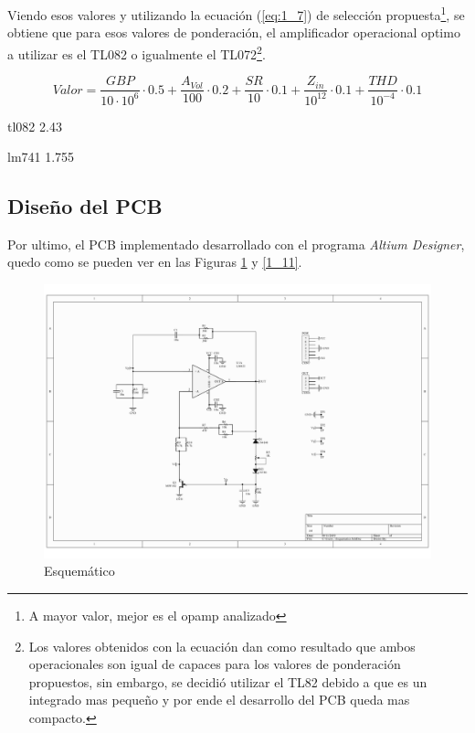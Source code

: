 Viendo esos valores y utilizando la ecuación (\ref{eq:1_7}) de selección
propuesta\footnote{A mayor valor, mejor es el opamp analizado}, se
obtiene que para esos valores de ponderación, el amplificador operacional
optimo a utilizar es el TL082 o igualmente el TL072\footnote{Los valores obtenidos con la ecuación dan como resultado que ambos
operacionales son igual de capaces para los valores de ponderación
propuestos, sin embargo, se decidió utilizar el TL82 debido a que
es un integrado mas pequeño y por ende el desarrollo del PCB queda
mas compacto.}.

\begin{equation}
Valor=\frac{GBP}{10\cdot10^{6}}\cdot0.5+\frac{A_{Vol}}{100}\cdot0.2+\frac{SR}{10}\cdot0.1+\frac{Z_{in}}{10^{12}}\cdot0.1+\frac{THD}{10^{-4}}\cdot0.1\label{eq:1_7}
\end{equation}

tl082 2.43

lm741 1.755

\subsection{Diseño del PCB}

Por ultimo, el PCB implementado desarrollado con el programa \emph{Altium
Designer}, quedo como se pueden ver en las Figuras \ref{1_10} y \ref{1_11}.

\begin{figure}[H]
\begin{centering}
\includegraphics[scale=0.5]{../Ex1/Resources/Esquematico}
\par\end{centering}
\caption{Esquemático}

\label{1_10}
\end{figure}

